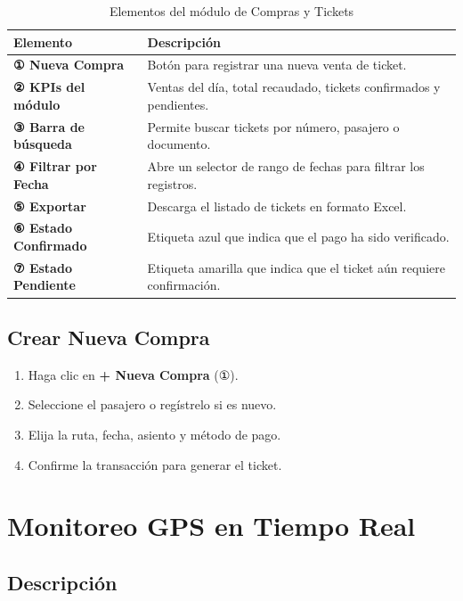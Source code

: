 \documentclass[12pt,a4paper]{report}
\begin{document}
\begin{table}[H]
  \centering
  \renewcommand{\arraystretch}{1.4}
  \begin{tabularx}{\textwidth}{@{}L{5cm} X@{}}
    \toprule
    \textbf{Elemento} & \textbf{Descripción} \\
    \midrule
    \textbf{① Nueva Compra} & Botón para registrar una nueva venta de ticket. \\
    \textbf{② KPIs del módulo} & Ventas del día, total recaudado, tickets confirmados y pendientes. \\
    \textbf{③ Barra de búsqueda} & Permite buscar tickets por número, pasajero o documento. \\
    \textbf{④ Filtrar por Fecha} & Abre un selector de rango de fechas para filtrar los registros. \\
    \textbf{⑤ Exportar} & Descarga el listado de tickets en formato Excel. \\
    \textbf{⑥ Estado Confirmado} & Etiqueta azul que indica que el pago ha sido verificado. \\
    \textbf{⑦ Estado Pendiente} & Etiqueta amarilla que indica que el ticket aún requiere confirmación. \\
    \bottomrule
  \end{tabularx}
  \caption{Elementos del módulo de Compras y Tickets}
\end{table}

\section{Crear Nueva Compra}

\begin{enumerate}
  \item Haga clic en \textbf{+ Nueva Compra} (①).
  \item Seleccione el pasajero o regístrelo si es nuevo.
  \item Elija la ruta, fecha, asiento y método de pago.
  \item Confirme la transacción para generar el ticket.
\end{enumerate}

\chapter{Monitoreo GPS en Tiempo Real}

\section{Descripción}
\end{document}
